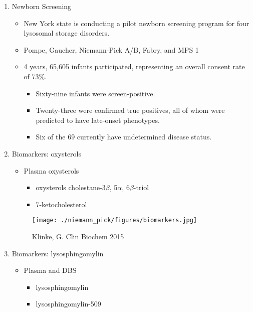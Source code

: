 \documentclass{scrartcl}
\begin{document}
\begin{enumerate}
\item Newborn Screening
\label{sec:orgf8bb295}
\begin{itemize}
\item New York state is conducting a pilot newborn screening program for four lysosomal storage disorders.
\item Pompe, Gaucher, Niemann-Pick A/B, Fabry, and MPS 1

\item 4 years, 65,605 infants participated, representing an overall consent rate of 73\%.
\begin{itemize}
\item Sixty-nine infants were screen-positive.
\item Twenty-three were confirmed true positives, all of whom were predicted to have late-onset phenotypes.
\item Six of the 69 currently have undetermined disease status.
\end{itemize}
\end{itemize}

\item Biomarkers: oxysterols
\label{sec:org48ac1fa}

\begin{itemize}
\item Plasma oxysterols
\begin{itemize}
\item oxysterols cholestane-3\(\beta\), 5\(\alpha\), 6\(\beta\)-triol
\item 7-ketocholesterol
\end{itemize}
\end{itemize}



\begin{figure}[htbp]
\centering
\texttt{[image: ./niemann\_pick/figures/biomarkers.jpg]}
\caption{\label{fig:orgc2baae5}
Klinke, G. Clin Biochem 2015}
\end{figure}

\item Biomarkers: lysosphingomylin
\label{sec:org0c821e5}

\begin{itemize}
\item Plasma and DBS
\begin{itemize}
\item lysosphingomylin
\item lysosphingomylin-509
\end{itemize}
\end{itemize}


\end{enumerate}
\end{document}
